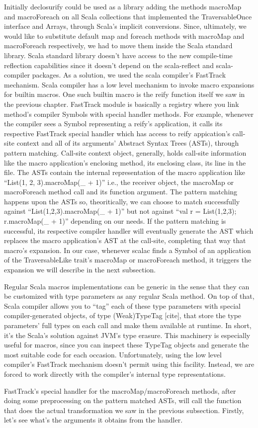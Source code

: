 Initially declosurify could be used as a library adding the methods macroMap
and macroForeach on all Scala collections that implemented the TraversableOnce
interface and Arrays, through Scala's implicit conversions. Since, ultimately,
we would like to substitute default map and foreach methods with macroMap and
macroForeach respectively, we had to move them inside the Scala standard
library. Scala standard library doesn't have access to the new compile-time
reflection capabilities since it doesn't depend on the scala-reflect and
scala-compiler packages. As a solution, we used the scala compiler's FastTrack
mechanism. Scala compiler has a low level mechanism to invoke macro expansions
for builtin macros. One such builtin macro is the reify function itself  we saw
in the previous chapter. FastTrack module is basically a registry where you
link method's compiler Symbols with special handler methods. For example,
whenever the compiler sees a Symbol representing a reify's application, it calls
its respective FastTrack special handler which has access to reify appication's
call-site context and all of  its arguments' Abstract Syntax Trees (ASTs),
through pattern matching. Call-site context object, generally, holds call-site
information like the macro application's enclosing method, its enclosing class,
its line in the file. The ASTs contain the internal representation of
the macro application like ``List(1, 2, 3).macroMap(_ + 1)'' i.e., the receiver
object, the macroMap or macroForeach method call and its function argument. The
pattern matching happens upon the ASTs so, theoritically, we can choose to
match successfully against ``List(1,2,3).macroMap(_ + 1)'' but not against ``val
r = List(1,2,3); r.macroMap(_ + 1)'' depending on our needs. If the pattern
matching is successful, its respective compiler handler will eventually
generate the AST which replaces the macro application's AST at the call-site,
completing that way that macro's expansion. In our case, whenever scalac
finds a Symbol of an application of the TraversableLike trait's macroMap or
macroForeach method, it triggers the expansion we will describe in the next
subsection.

Regular Scala macros implementations can be generic in the sense that they can
be customized with type parameters as any regular Scala method. On top of that,
Scala compiler allows you to ``tag'' each of these type parameters with special
compiler-generated objects, of type (Weak)TypeTag [cite], that store the type
parameters' full types on each call and make them available at runtime. In
short, it's the Scala's solution against JVM's type erasure. This machinery is
especially useful for macros, since you can inspect these TypeTag objects and
generate the most suitable code for each occasion. Unfortunately, using the low
level compiler's FastTrack mechanism doesn't permit using this facility.
Instead, we are forced to work directly with the compiler's internal type
representations.

FastTrack's special handler for the macroMap/macroForeach methods, after
doing some preprocessing on the pattern matched ASTs, will call the function
that does the actual transformation we saw in the previous subsection. Firstly,
let's see what's the arguments it obtains from the handler.
